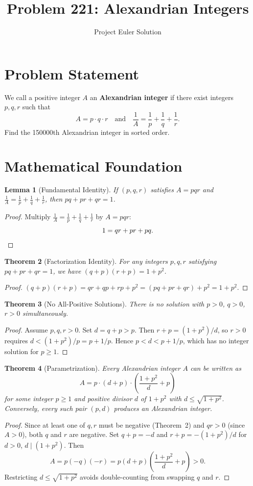 \documentclass[12pt]{article}
\title{Problem 221: Alexandrian Integers}
\author{Project Euler Solution}
\date{}
\newtheorem{theorem}{Theorem}
\newtheorem{lemma}[theorem]{Lemma}
\begin{document}
\maketitle

\section{Problem Statement}
We call a positive integer $A$ an \textbf{Alexandrian integer} if there exist integers $p, q, r$ such that
\[
A = p \cdot q \cdot r \quad \text{and} \quad \frac{1}{A} = \frac{1}{p} + \frac{1}{q} + \frac{1}{r}.
\]
Find the 150000th Alexandrian integer in sorted order.

\section{Mathematical Foundation}

\begin{lemma}[Fundamental Identity]
If $(p,q,r)$ satisfies $A = pqr$ and $\frac{1}{A} = \frac{1}{p} + \frac{1}{q} + \frac{1}{r}$, then $pq + pr + qr = 1$.
\end{lemma}
\begin{proof}
Multiply $\frac{1}{A} = \frac{1}{p} + \frac{1}{q} + \frac{1}{r}$ by $A = pqr$:
\[
1 = qr + pr + pq.  \qedhere
\]
\end{proof}

\begin{theorem}[Factorization Identity]
For any integers $p, q, r$ satisfying $pq + pr + qr = 1$, we have $(q+p)(r+p) = 1 + p^2$.
\end{theorem}
\begin{proof}
$(q+p)(r+p) = qr + qp + rp + p^2 = (pq + pr + qr) + p^2 = 1 + p^2$.
\end{proof}

\begin{theorem}[No All-Positive Solutions]
There is no solution with $p > 0$, $q > 0$, $r > 0$ simultaneously.
\end{theorem}
\begin{proof}
Assume $p, q, r > 0$. Set $d = q + p > p$. Then $r + p = (1+p^2)/d$, so $r > 0$ requires $d < (1+p^2)/p = p + 1/p$. Hence $p < d < p + 1/p$, which has no integer solution for $p \geq 1$.
\end{proof}

\begin{theorem}[Parametrization]
Every Alexandrian integer $A$ can be written as
\[
A = p \cdot (d + p) \cdot \left(\frac{1+p^2}{d} + p\right)
\]
for some integer $p \geq 1$ and positive divisor $d$ of $1 + p^2$ with $d \leq \sqrt{1+p^2}$. Conversely, every such pair $(p, d)$ produces an Alexandrian integer.
\end{theorem}
\begin{proof}
Since at least one of $q, r$ must be negative (Theorem~2) and $qr > 0$ (since $A > 0$), both $q$ and $r$ are negative. Set $q + p = -d$ and $r + p = -(1+p^2)/d$ for $d > 0$, $d \mid (1+p^2)$. Then
\[
A = p(-q)(-r) = p(d+p)\!\left(\frac{1+p^2}{d} + p\right) > 0.
\]
Restricting $d \leq \sqrt{1+p^2}$ avoids double-counting from swapping $q$ and $r$.
\end{proof}
\end{document}
